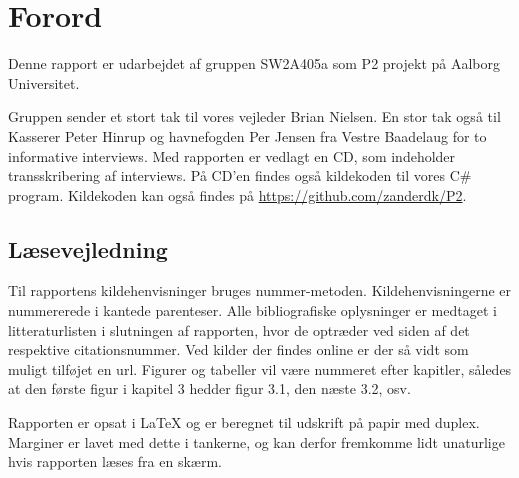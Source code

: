 \chapter*{Forord}
Denne rapport er udarbejdet af gruppen SW2A405a som P2 projekt på Aalborg Universitet.


Gruppen sender et stort tak til vores vejleder Brian Nielsen.
En stor tak også til Kasserer Peter Hinrup og havnefogden Per Jensen fra Vestre Baadelaug for to informative interviews.
Med rapporten er vedlagt en CD, som indeholder transskribering af interviews. På CD'en findes  også kildekoden til vores C\# program. Kildekoden kan også findes på \url{https://github.com/zanderdk/P2}.

\section{Læsevejledning}
Til rapportens kildehenvisninger bruges nummer-metoden. Kildehenvisningerne er nummererede i kantede parenteser. Alle bibliografiske oplysninger er medtaget i litteraturlisten i slutningen af rapporten, hvor de optræder ved siden af det respektive citationsnummer. Ved kilder der findes online er der så vidt som muligt tilføjet en url. Figurer og tabeller vil være nummeret efter kapitler, således at den første figur i kapitel 3 hedder figur 3.1, den næste 3.2, osv.	

Rapporten er opsat i \LaTeX{} og er beregnet til udskrift på papir med duplex. Marginer er lavet med dette i tankerne, og kan derfor fremkomme lidt unaturlige hvis rapporten læses fra en skærm.
